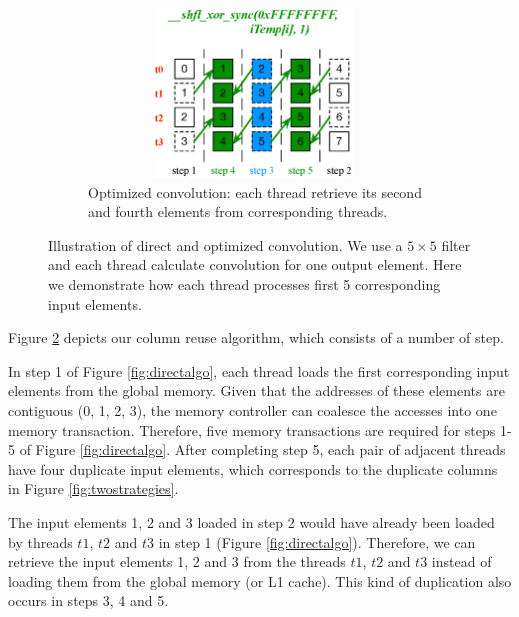 \begin{figure}[t!]
\begin{subfigure}{0.3\textwidth}
		 \includegraphics[width=0.96\textwidth,height=4.5cm]{./figure/optalgo2.eps}
		 \caption{Optimized convolution: each thread retrieve its second and fourth elements from corresponding threads.}
		 \label{fig:optalgo2}
	\end{subfigure}
  \caption{Illustration of direct and optimized convolution. We use a $5 \times 5$ filter  and each thread calculate convolution for one output element. Here we demonstrate how each thread processes first 5 corresponding input elements.}
   \label{fig:corealgo}
\end{figure}



Figure \ref{fig:corealgo} depicts our column reuse algorithm, which consists of a number of step.

 In step 1 of Figure \ref{fig:directalgo}, each thread loads the first corresponding input elements from the
global memory. Given that the addresses of these elements are contiguous (0, 1, 2, 3), the memory controller can coalesce the accesses into
one memory transaction. Therefore, five memory transactions are required for steps 1-5 of Figure \ref{fig:directalgo}. After completing step 5, each pair of adjacent threads have four
duplicate input elements, which corresponds to the duplicate columns in Figure \ref{fig:twostrategies}.

The input elements 1, 2 and 3 loaded in step 2 would have already been loaded by threads $t1$, $t2$ and $t3$ in step 1 (Figure
\ref{fig:directalgo}). Therefore, we can retrieve the input elements 1, 2 and 3 from the threads $t1$, $t2$ and $t3$ instead of loading
them from the global memory (or L1 cache). This kind of duplication also occurs in steps 3, 4 and 5.


